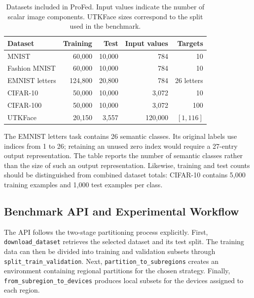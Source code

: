 \begin{table}[t]
  \centering
  \caption{Datasets included in ProFed. Input values indicate the number
   of scalar image components. UTKFace sizes correspond to the split
   used in the benchmark.}
  \label{tab:datasets}
  \begin{tabular}{lrrrr}
    \toprule
    \textbf{Dataset} & \textbf{Training} & \textbf{Test}
      & \textbf{Input values} & \textbf{Targets} \\
    \midrule
    MNIST         & 60,000  & 10,000 & 784     & 10 \\
    Fashion MNIST & 60,000  & 10,000 & 784     & 10 \\
    EMNIST letters& 124,800 & 20,800 & 784     & 26 letters \\
    CIFAR-10      & 50,000  & 10,000 & 3,072   & 10 \\
    CIFAR-100     & 50,000  & 10,000 & 3,072   & 100 \\
    UTKFace       & 20,150  & 3,557  & 120,000 & $[1,116]$ \\
    \bottomrule
  \end{tabular}
\end{table}

The EMNIST letters task contains 26 semantic classes.
%
Its original labels use indices from 1 to 26; retaining an unused zero
 index would require a 27-entry output representation.
%
The table reports the number of semantic classes rather than the size
 of such an output representation.
%
Likewise, training and test counts should be distinguished from combined
 dataset totals: CIFAR-10 contains 5,000 training examples and 1,000 test
 examples per class.

\subsection{Benchmark API and Experimental Workflow}
\label{sec:profed-api}

The API follows the two-stage partitioning process explicitly.
%
First, \texttt{download\_\allowbreak dataset} retrieves the selected dataset and its
 test split.
%
The training data can then be divided into training and validation subsets
 through \texttt{split\_\allowbreak train\_\allowbreak validation}.
%
Next, \texttt{partition\_\allowbreak to\_\allowbreak subregions} creates an environment containing
 regional partitions for the chosen strategy.
%
Finally, \texttt{from\_\allowbreak subregion\_\allowbreak to\_\allowbreak devices} produces local subsets for
 the devices assigned to each region.

